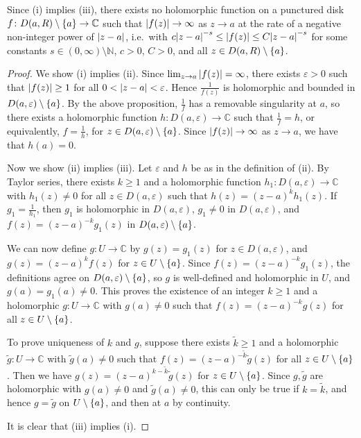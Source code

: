 \begin{remark}
	Since (i) implies (iii), there exists no holomorphic function on a punctured disk \( f \colon D(a,R) \setminus \qty{a} \to \mathbb C \) such that \( \abs{f(z)} \to \infty \) as \( z \to a \) at the rate of a negative non-integer power of \( \abs{z-a} \), i.e.\ with \( c\abs{z-a}^{-s} \leq \abs{f(z)} \leq C\abs{z-a}^{-s} \) for some constants \( s \in (0,\infty) \setminus \mathbb N \), \( c > 0 \), \( C > 0 \), and all \( z \in D(a,R) \setminus \qty{a} \).
\end{remark}
\begin{proof}
	We show (i) implies (ii).
	Since \( \lim_{z \to a} \abs{f(z)} = \infty \), there exists \( \varepsilon > 0 \) such that \( \abs{f(z)} \geq 1 \) for all \( 0 < \abs{z-a} < \varepsilon \).
	Hence \( \frac{1}{f(z)} \) is holomorphic and bounded in \( D(a,\varepsilon) \setminus \qty{a} \).
	By the above proposition, \( \frac{1}{f} \) has a removable singularity at \( a \), so there exists a holomorphic function \( h \colon D(a,\varepsilon) \to \mathbb C \) such that \( \frac{1}{f} = h \), or equivalently, \( f = \frac{1}{h} \), for \( z \in D(a,\varepsilon) \setminus \qty{a} \).
	Since \( \abs{f(z)} \to \infty \) as \( z \to a \), we have that \( h(a) = 0 \).

	Now we show (ii) implies (iii).
	Let \( \varepsilon \) and \( h \) be as in the definition of (ii).
	By Taylor series, there exists \( k \geq 1 \) and a holomorphic function \( h_1 \colon D(a,\varepsilon) \to \mathbb C \) with \( h_1(z) \neq 0 \) for all \( z \in D(a,\varepsilon) \) such that \( h(z) = (z-a)^k h_1(z) \).
	If \( g_1 = \frac{1}{h_1} \), then \( g_1 \) is holomorphic in \( D(a,\varepsilon) \), \( g_1 \neq 0 \) in \( D(a,\varepsilon) \), and \( f(z) = (z-a)^{-k} g_1(z) \) in \( D(a,\varepsilon) \setminus \qty{a} \).

	We can now define \( g \colon U \to \mathbb C \) by \( g(z) = g_1(z) \) for \( z \in D(a,\varepsilon) \), and \( g(z) = (z-a)^k f(z) \) for \( z \in U \setminus \qty{a} \).
	Since \( f(z) = (z-a)^{-k} g_1(z) \), the definitions agree on \( D(a,\varepsilon) \setminus \qty{a} \), so \( g \) is well-defined and holomorphic in \( U \), and \( g(a) = g_1(a) \neq 0 \).
	This proves the existence of an integer \( k \geq 1 \) and a holomorphic \( g \colon U \to \mathbb C \) with \( g(a) \neq 0 \) such that \( f(z) = (z-a)^{-k} g(z) \) for all \( z \in U \setminus \qty{a} \).

	To prove uniqueness of \( k \) and \( g \), suppose there exists \( \widetilde k \geq 1 \) and a holomorphic \( \widetilde g \colon U \to \mathbb C \) with \( \widetilde g(a) \neq 0 \) such that \( f(z) = (z-a)^{-\widetilde k} \widetilde g(z) \) for all \( z \in U \setminus \qty{a} \).
	Then we have \( g(z) = (z-a)^{k - \widetilde k} \widetilde g(z) \) for \( z \in U \setminus \qty{a} \).
	Since \( g, \widetilde g \) are holomorphic with \( g(a) \neq 0 \) and \( \widetilde g(a) \neq 0 \), this can only be true if \( k = \widetilde k \), and hence \( g = \widetilde g \) on \( U \setminus \qty{a} \), and then at \( a \) by continuity.

	It is clear that (iii) implies (i).
\end{proof}
